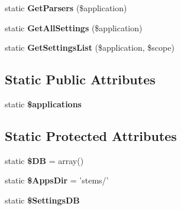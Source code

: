 \begin{DoxyCompactItemize}
\item 
\hypertarget{class_hypo_conf_1_1_config_scopes_1_1_applications_d_b_af7b41e4af1f978c719fa1981650f4949}{
static {\bfseries \-Get\-Parsers} (\$application)}
\label{class_hypo_conf_1_1_config_scopes_1_1_applications_d_b_af7b41e4af1f978c719fa1981650f4949}

\item 
\hypertarget{class_hypo_conf_1_1_config_scopes_1_1_applications_d_b_af0aeb3a47f085000fe104aae25584cb0}{
static {\bfseries \-Get\-All\-Settings} (\$application)}
\label{class_hypo_conf_1_1_config_scopes_1_1_applications_d_b_af0aeb3a47f085000fe104aae25584cb0}

\item 
\hypertarget{class_hypo_conf_1_1_config_scopes_1_1_applications_d_b_a1525e16222d5e8c67718e51fdf6f5661}{
static {\bfseries \-Get\-Settings\-List} (\$application, \$scope)}
\label{class_hypo_conf_1_1_config_scopes_1_1_applications_d_b_a1525e16222d5e8c67718e51fdf6f5661}

\end{DoxyCompactItemize}
\subsection*{\-Static \-Public \-Attributes}
\begin{DoxyCompactItemize}
\item 
static {\bfseries \$applications}
\end{DoxyCompactItemize}
\subsection*{\-Static \-Protected \-Attributes}
\begin{DoxyCompactItemize}
\item 
\hypertarget{class_hypo_conf_1_1_config_scopes_1_1_applications_d_b_a7dc56dc8b18ad37272b56fa7395bedef}{
static {\bfseries \$\-D\-B} = array()}
\label{class_hypo_conf_1_1_config_scopes_1_1_applications_d_b_a7dc56dc8b18ad37272b56fa7395bedef}

\item 
\hypertarget{class_hypo_conf_1_1_config_scopes_1_1_applications_d_b_aab576317dd3b9ca4f5ca07dc7963834a}{
static {\bfseries \$\-Apps\-Dir} = 'stems/'}
\label{class_hypo_conf_1_1_config_scopes_1_1_applications_d_b_aab576317dd3b9ca4f5ca07dc7963834a}

\item 
\hypertarget{class_hypo_conf_1_1_config_scopes_1_1_applications_d_b_a3840e749730a10702dd3e53ab4621318}{
static {\bfseries \$\-Settings\-D\-B}}
\label{class_hypo_conf_1_1_config_scopes_1_1_applications_d_b_a3840e749730a10702dd3e53ab4621318}

\end{DoxyCompactItemize}


